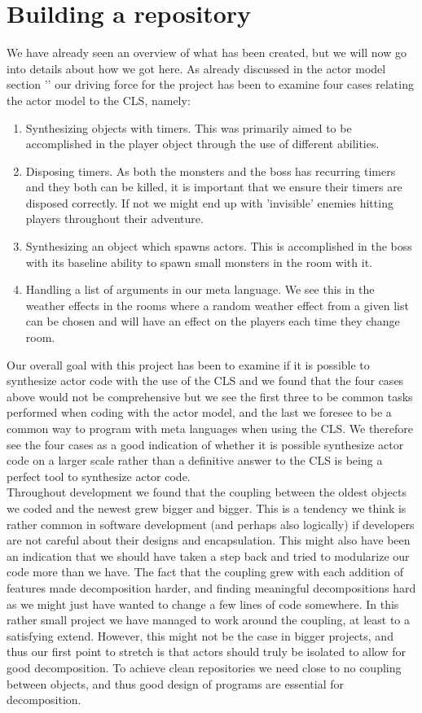 \section{Building a repository}
We have already seen an overview of what has been created, but we will now go into details about how we got here. As already discussed in the actor model section '' our driving force for the project has been to examine four cases relating the actor model to the CLS, namely:
\begin{enumerate}
	\item Synthesizing objects with timers. This was primarily aimed to be accomplished in the player object through the use of different abilities.
	\item Disposing timers. As both the monsters and the boss has recurring timers and they both can be killed, it is important that we ensure their timers are disposed correctly. If not we might end up with 'invisible' enemies hitting players throughout their adventure.
	\item Synthesizing an object which spawns actors. This is accomplished in the boss with its baseline ability to spawn small monsters in the room with it.
	\item Handling a list of arguments in our meta language. We see this in the weather effects in the rooms where a random weather effect from a given list can be chosen and will have an effect on the players each time they change room.
\end{enumerate}
Our overall goal with this project has been to examine if it is possible to synthesize actor code with the use of the CLS and we found that the four cases above would not be comprehensive but we see the first three to be common tasks performed when coding with the actor model, and the last we foresee to be a common way to program with meta languages when using the CLS. We therefore see the four cases as a good indication of whether it is possible synthesize actor code on a larger scale rather than a definitive answer to the CLS is being a perfect tool to synthesize actor code.\\

Throughout development we found that the coupling between the oldest objects we coded and the newest grew bigger and bigger. This is a tendency we think is rather common in software development (and perhaps also logically) if developers are not careful about their designs and encapsulation. This might also have been an indication that we should have taken a step back and tried to modularize our code more than we have. The fact that the coupling grew with each addition of features made decomposition harder, and finding meaningful decompositions hard as we might just have wanted to change a few lines of code somewhere. In this rather small project we have managed to work around the coupling, at least to a satisfying extend. However, this might not be the case in bigger projects, and thus our first point to stretch is that actors should truly be isolated to allow for good decomposition. To achieve clean repositories we need close to no coupling between objects, and thus good design of programs are essential for decomposition. 

